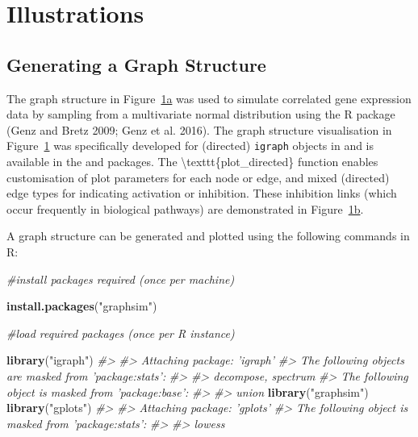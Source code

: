 \documentclass[]{article}
\newenvironment{Shaded}{\begin{snugshade}}{\end{snugshade}}
\newcommand{\CommentTok}[1]{\textcolor[rgb]{0.56,0.35,0.01}{\textit{#1}}}
\newcommand{\KeywordTok}[1]{\textcolor[rgb]{0.13,0.29,0.53}{\textbf{#1}}}
\newcommand{\NormalTok}[1]{#1}
\newcommand{\StringTok}[1]{\textcolor[rgb]{0.31,0.60,0.02}{#1}}
\begin{document}
\hypertarget{sec:illustrations}{%
\section{Illustrations}\label{sec:illustrations}}

\hypertarget{sec:plot_graph}{%
\subsection{Generating a Graph Structure}\label{sec:plot_graph}}

The graph structure in
Figure~\protect\hyperlink{fig:simple_graph:first}{1a} was used to
simulate correlated gene expression data by sampling from a multivariate
normal distribution using the R package (Genz and Bretz 2009; Genz et
al. 2016). The graph structure visualisation in
Figure~\protect\hyperlink{fig:simple_graph}{1} was specifically
developed for (directed) \texttt{igraph} objects in and is available in
the and packages. The \textbackslash{}texttt\{plot\_directed\} function
enables customisation of plot parameters for each node or edge, and
mixed (directed) edge types for indicating activation or inhibition.
These inhibition links (which occur frequently in biological pathways)
are demonstrated in
Figure~\protect\hyperlink{fig:simple_graph:second}{1b}.

A graph structure can be generated and plotted using the following
commands in R:

\begin{Shaded}
\begin{Highlighting}[]
\CommentTok{#install packages required (once per machine)}

\KeywordTok{install.packages}\NormalTok{(}\StringTok{"graphsim"}\NormalTok{)}
\end{Highlighting}
\end{Shaded}

\begin{Shaded}
\begin{Highlighting}[]
\CommentTok{#load required packages (once per R instance)}

\KeywordTok{library}\NormalTok{(}\StringTok{"igraph"}\NormalTok{)}
\CommentTok{#> }
\CommentTok{#> Attaching package: 'igraph'}
\CommentTok{#> The following objects are masked from 'package:stats':}
\CommentTok{#> }
\CommentTok{#>     decompose, spectrum}
\CommentTok{#> The following object is masked from 'package:base':}
\CommentTok{#> }
\CommentTok{#>     union}
\KeywordTok{library}\NormalTok{(}\StringTok{"graphsim"}\NormalTok{)}
\KeywordTok{library}\NormalTok{(}\StringTok{"gplots"}\NormalTok{)}
\CommentTok{#> }
\CommentTok{#> Attaching package: 'gplots'}
\CommentTok{#> The following object is masked from 'package:stats':}
\CommentTok{#> }
\CommentTok{#>     lowess}
\end{Highlighting}
\end{Shaded}
\end{document}
